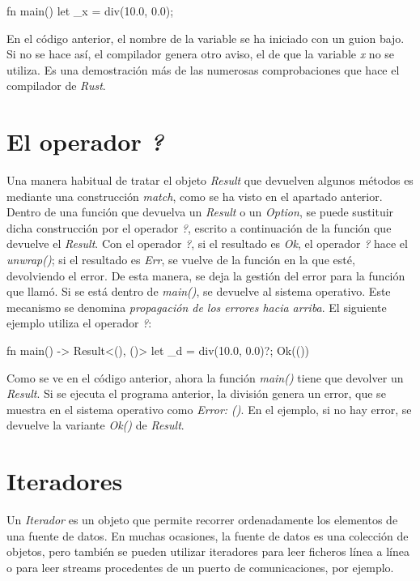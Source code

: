 \begin{Codigo}
   fn main() {
      let _x = div(10.0, 0.0);
   }
\end{Codigo}

En el código anterior, el nombre de la variable se ha iniciado con un guion bajo. Si no se hace así, el compilador genera otro aviso, el de que la variable \textit{x} no se utiliza. Es una demostración más de las numerosas comprobaciones que hace el compilador de \textit{Rust}.

\section{El operador \textit{?}}
\label{sec_operador_?}
\noindent Una manera habitual de tratar el objeto \textit{Result} que devuelven algunos métodos es mediante una construcción \textit{match}, como se ha visto en el apartado anterior. Dentro de una función que devuelva un \textit{Result} o un \textit{Option}, se puede sustituir dicha construcción por el operador \textit{?}, escrito a continuación de la función que devuelve el \textit{Result}. Con el operador \textit{?}, si el resultado es \textit{Ok}, el operador \textit{?} hace el \textit{unwrap()}; si el resultado es \textit{Err}, se vuelve de la función en la que esté, devolviendo el error. De esta manera, se deja la gestión del error para la función que llamó. Si se está dentro de \textit{main()}, se devuelve al sistema operativo. Este mecanismo se denomina \textit{propagación de los errores hacia arriba}. El siguiente ejemplo utiliza el operador \textit{?}:

\begin{Codigo}
   fn main() -> Result<(), ()> {
      let _d = div(10.0, 0.0)?;
      Ok(())
   }
\end{Codigo}

Como se ve en el código anterior, ahora la función \textit{main()} tiene que devolver un \textit{Result}. Si se ejecuta el programa anterior, la división genera un error, que se muestra en el sistema operativo como \textit{Error: ()}. En el ejemplo, si no hay error, se devuelve la variante \textit{Ok()} de \textit{Result}. 

\section{Iteradores}
\label{sec_iteradorees}
\noindent Un \textit{Iterador} es un objeto que permite recorrer ordenadamente los elementos de una fuente de datos. En muchas ocasiones, la fuente de datos es una colección de objetos, pero también se pueden utilizar iteradores para leer ficheros línea a línea o para leer streams procedentes de un puerto de comunicaciones, por ejemplo.

